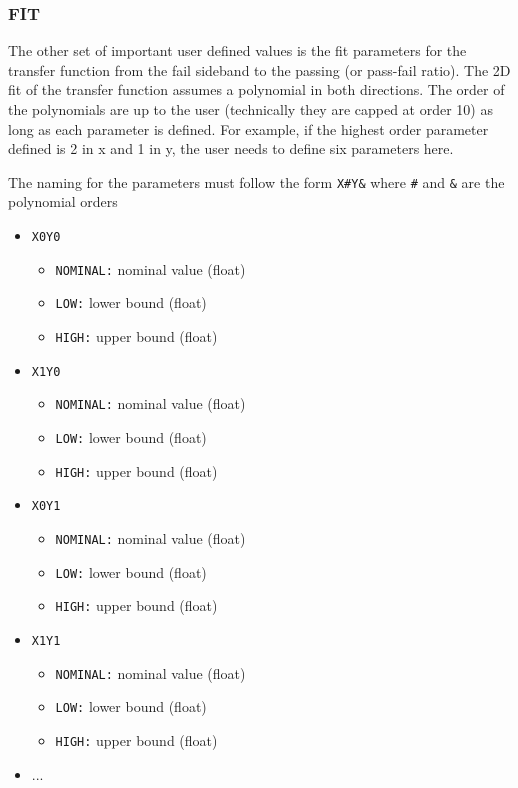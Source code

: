 \documentclass[letter]{article}
\begin{document}
        \subsubsection{FIT}
            The other set of important user defined values is the fit parameters for the transfer function from the fail sideband to the passing (or pass-fail ratio). The 2D fit of the transfer function assumes a polynomial in both directions. The order of the polynomials are up to the user (technically they are capped at order 10) as long as each parameter is defined. For example, if the highest order parameter defined is 2 in x and 1 in y, the user needs to define six parameters here.

            The naming for the parameters must follow the form \verb"X#Y&" where \verb"#" and \verb"&" are the polynomial orders
            \begin{itemize}
                \item \verb"X0Y0"
                \begin{itemize}
                    \item \verb"NOMINAL:" nominal value (float)
                    \item \verb"LOW:" lower bound (float)
                    \item \verb"HIGH:" upper bound (float)
                \end{itemize}
                \item \verb"X1Y0"
                \begin{itemize}
                    \item \verb"NOMINAL:" nominal value (float)
                    \item \verb"LOW:" lower bound (float)
                    \item \verb"HIGH:" upper bound (float)
                \end{itemize}
                \item \verb"X0Y1"
                \begin{itemize}
                    \item \verb"NOMINAL:" nominal value (float)
                    \item \verb"LOW:" lower bound (float)
                    \item \verb"HIGH:" upper bound (float)
                \end{itemize}
                \item \verb"X1Y1"
                \begin{itemize}
                    \item \verb"NOMINAL:" nominal value (float)
                    \item \verb"LOW:" lower bound (float)
                    \item \verb"HIGH:" upper bound (float)
                \end{itemize}
                \item ...
            \end{itemize}
\end{document}
